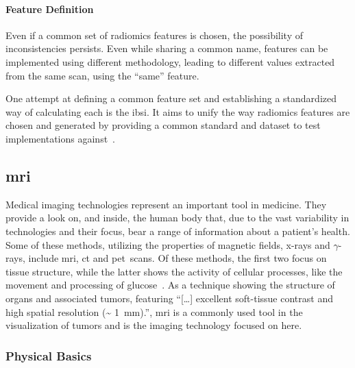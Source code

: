 \paragraph{Feature Definition} Even if a common set of radiomics features is chosen, the possibility of 
inconsistencies persists. Even while sharing a common name, features can be 
implemented using different methodology, leading to different values extracted 
from the same scan, using the \enquote{same} feature. 

One attempt at defining a common feature set and establishing a standardized way
of calculating each is the \acf{ibsi}. It aims to unify the way radiomics 
features are chosen and generated by providing a common standard and dataset to 
test implementations against~\cite{ibsi_paper}.

\subsection{\acl{mri}}\label{sec:intro_mri}

Medical imaging technologies represent an important tool in medicine. They 
provide a look on, and inside, the human body that, due to the vast variability
in technologies and their focus, bear a range of information about a patient's 
health. Some of these methods, utilizing the properties of magnetic fields, 
x-rays and $\gamma$-rays, include \acf{mri}, \acf{ct} and 
\acf{pet}~scans. Of these methods, the first two focus on tissue structure, while
the latter shows the activity of cellular processes, like the movement and 
processing of glucose~\cite{radiomics_advanced_feature_analysis,medical_imaging_last_50,medical_imaging}. 
As a technique showing the structure of organs and associated tumors, featuring
\enquote{[\ldots] excellent soft-tissue contrast and high spatial resolution 
(\~{} 1~mm).}\cite[p.~15]{medical_imaging}, \ac{mri} is a commonly used tool in 
the visualization of tumors and is the imaging technology focused on here.

\subsubsection{Physical Basics}

